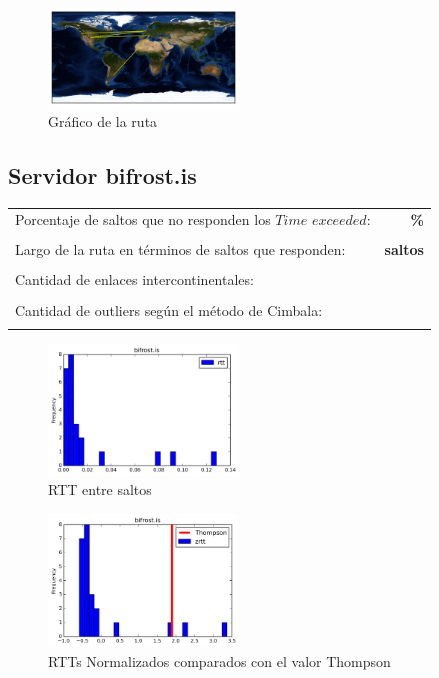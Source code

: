 \begin{figure}[H]
  \centering
    \includegraphics[width=0.45\textwidth]{grafico-rutas/www-uae-ma.png}
  \caption{Gráfico de la ruta}
  \label{entropia-s}
\end{figure}




\subsection{Servidor bifrost.is}

\begin{center}
\begin{tabular}{p{6.5cm}r}
Porcentaje de saltos que no responden los $Time$ $exceeded$: & \textbf{\%} \\ \\ 
Largo de la ruta en términos de saltos que responden: &\textbf{ saltos} \\ \\
Cantidad de enlaces intercontinentales: & \textbf{} \\ \\
Cantidad de outliers según el método de Cimbala: & \textbf{} \\ \\
\end{tabular}
\end{center}

\begin{figure}[H]
  \centering
    \includegraphics[width=0.45\textwidth]{histogramas_rtt/bifrost-is.png}
  \caption{RTT entre saltos}
  \label{entropia-s}
\end{figure}

\begin{figure}[H]
  \centering
    \includegraphics[width=0.45\textwidth]{histogramas_thompson/bifrost-is.png}
  \caption{RTTs Normalizados comparados con el valor Thompson}
  \label{entropia-s}
\end{figure}

